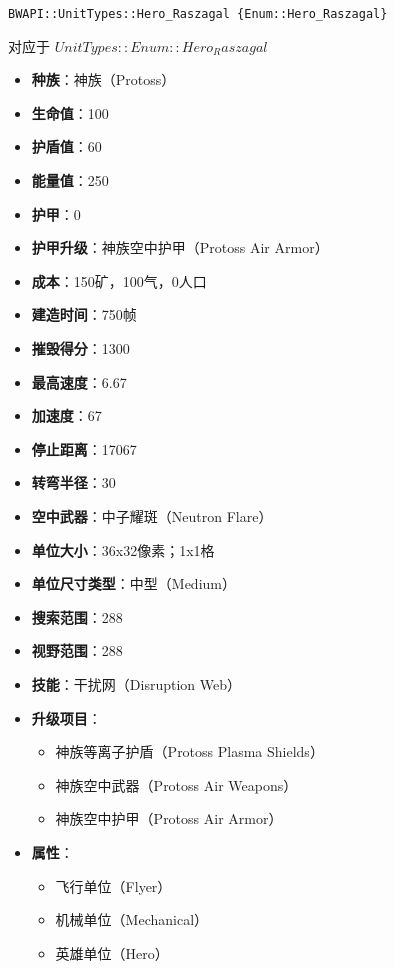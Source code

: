 \begin{tcolorbox}[colback=white, colframe=black!60!white, title=Hero\_Raszagal(), arc=0mm]
    \begin{verbatim}
BWAPI::UnitTypes::Hero_Raszagal {Enum::Hero_Raszagal}
    \end{verbatim}
    对应于  $ UnitTypes::Enum::Hero_Raszagal $ 
    \begin{itemize}
        \item \textbf{种族}：神族（Protoss）
        \item \textbf{生命值}：100
        \item \textbf{护盾值}：60
        \item \textbf{能量值}：250
        \item \textbf{护甲}：0
        \item \textbf{护甲升级}：神族空中护甲（Protoss Air Armor）
        \item \textbf{成本}：150矿，100气，0人口
        \item \textbf{建造时间}：750帧
        \item \textbf{摧毁得分}：1300
        \item \textbf{最高速度}：6.67
        \item \textbf{加速度}：67
        \item \textbf{停止距离}：17067
        \item \textbf{转弯半径}：30
        \item \textbf{空中武器}：中子耀斑（Neutron Flare）
        \item \textbf{单位大小}：36x32像素；1x1格
        \item \textbf{单位尺寸类型}：中型（Medium）
        \item \textbf{搜索范围}：288
        \item \textbf{视野范围}：288
        \item \textbf{技能}：干扰网（Disruption Web）
        \item \textbf{升级项目}：
            \begin{itemize}
                \item 神族等离子护盾（Protoss Plasma Shields）
                \item 神族空中武器（Protoss Air Weapons）
                \item 神族空中护甲（Protoss Air Armor）
            \end{itemize}
        \item \textbf{属性}：
            \begin{itemize}
                \item 飞行单位（Flyer）
                \item 机械单位（Mechanical）
                \item 英雄单位（Hero）
            \end{itemize}
    \end{itemize}
\end{tcolorbox}

